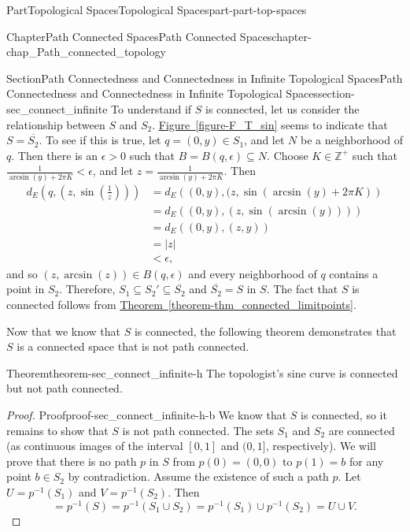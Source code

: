 \documentclass[oneside,10pt,]{book}
\newcommand{\xreffont}{\relax}
\numberwithin{equation}{chapter}
\newcommand{\Z}{\mathbb{Z}}
\newcommand{\la}{\left|}
\newcommand{\ra}{\right|}
\newcommand{\lt}{<}
\newcommand{\gt}{>}
\newcommand{\amp}{&}
\begin{document}
\begin{partptx}{Part}{Topological Spaces}{}{Topological Spaces}{}{}{part-part-top-spaces}
\begin{chapterptx}{Chapter}{Path Connected Spaces}{}{Path Connected Spaces}{}{}{chapter-chap_Path_connected_topology}
\begin{sectionptx}{Section}{Path Connectedness and Connectedness in Infinite Topological Spaces}{}{Path Connectedness and Connectedness in Infinite Topological Spaces}{}{}{section-sec_connect_infinite}
To understand if \(S\) is connected, let us consider the relationship between \(S\) and \(S_2\). \hyperref[figure-F_T_sin]{Figure~{\xreffont\ref{figure-F_T_sin}}} seems to indicate that \(S = \overline{S_2}\). To see if this is true, let \(q=(0,y) \in S_1\), and let \(N\) be a neighborhood of \(q\). Then there is an \(\epsilon \gt 0\) such that \(B = B(q, \epsilon) \subseteq N\). Choose \(K \in \Z^+\) such that \(\frac{1}{\arcsin(y)+2 \pi K} \lt  \epsilon\), and let \(z = \frac{1}{\arcsin(y)+2 \pi K}\). Then%
\begin{align*}
d_E\left(q,\left(z, \sin\left(\frac{1}{z}\right)\right)\right) \amp =  d_E\left((0,y),(z, \sin(\arcsin(y)+2 \pi K)\right)\\
\amp = d_E((0,y), (z,\sin(\arcsin(y))))\\
\amp = d_E((0,y), (z,y))\\
\amp = \la z \ra\\
\amp \lt  \epsilon\text{,}
\end{align*}
and so \(\left(z, \arcsin(z)\right) \in B(q, \epsilon)\) and every neighborhood of \(q\) contains a point in \(S_2\). Therefore, \(S_1 \subseteq S_2' \subseteq \overline{S_2}\) and \(\overline{S_2} = S\) in \(S\). The fact that \(S\) is connected follows from \hyperref[theorem-thm_connected_limitpoints]{Theorem~{\xreffont\ref{theorem-thm_connected_limitpoints}}}.%
\par
Now that we know that \(S\) is connected, the following theorem demonstrates that \(S\) is a connected space that is not path connected.%
\begin{theorem}{Theorem}{}{}{theorem-sec_connect_infinite-h}%
The topologist's sine curve is connected but not path connected.%
\end{theorem}
\begin{proof}{Proof}{}{proof-sec_connect_infinite-h-b}
We know that \(S\) is connected, so it remains to show that \(S\) is not path connected. The sets \(S_1\) and \(S_2\) are connected (as continuous images of the interval \([0,1]\) and \((0,1]\), respectively). We will prove that there is no path \(p\) in \(S\) from \(p(0) = (0,0)\) to \(p(1) =  b\) for any point \(b \in S_2\) by contradiction. Assume the existence of such a path \(p\). Let \(U = p^{-1}(S_1)\) and \(V = p^{-1}(S_2)\). Then%
\begin{equation}
[0,1] = p^{-1}(S) = p^{-1}(S_1 \cup S_2) = p^{-1}(S_1) \cup p^{-1}(S_2) = U \cup V\text{.}\label{men-eq_TSC_1}
\end{equation}
%
\par

\end{proof}
\end{sectionptx}
\end{chapterptx}
\end{partptx}
\end{document}
